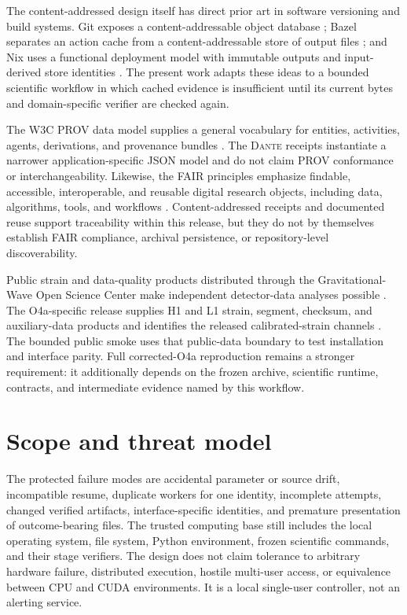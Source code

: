 \documentclass[aps,prd,twocolumn,superscriptaddress,nofootinbib,amsmath,amssymb,floatfix,10pt]{revtex4-2}
\newcommand{\dante}{\textsc{Dante}}
\begin{document}
The content-addressed design itself has direct prior art in software versioning
and build systems.  Git exposes a content-addressable object database
\cite{chacon2014progit}; Bazel separates an action cache from a
content-addressable store of output files \cite{bazel2026cache}; and Nix uses a
functional deployment model with immutable outputs and input-derived store
identities \cite{dolstra2006nix}.  The present work adapts these ideas to a
bounded scientific workflow in which cached evidence is insufficient until its
current bytes and domain-specific verifier are checked again.

The W3C PROV data model supplies a general vocabulary for entities, activities,
agents, derivations, and provenance bundles \cite{moreau2013provdm}.  The
\dante{} receipts instantiate a narrower application-specific JSON model and
do not claim PROV conformance or interchangeability.  Likewise, the FAIR
principles emphasize findable, accessible, interoperable, and reusable digital
research objects, including data, algorithms, tools, and workflows
\cite{wilkinson2016fair}.  Content-addressed receipts and documented reuse
support traceability within this release, but they do not by themselves
establish FAIR compliance, archival persistence, or repository-level
discoverability.

Public strain and data-quality products distributed through the
Gravitational-Wave Open Science Center make independent detector-data analyses
possible \cite{abbott2021gwosc}.  The O4a-specific release supplies H1 and L1
strain, segment, checksum, and auxiliary-data products and identifies the
released calibrated-strain channels \cite{gwosc2025o4a}.  The bounded public
smoke uses that public-data boundary to test installation and interface parity.
Full corrected-O4a reproduction remains a stronger requirement: it additionally
depends on the frozen archive, scientific runtime, contracts, and intermediate
evidence named by this workflow.

\section{Scope and threat model}
\label{sec:scope}

The protected failure modes are accidental parameter or source drift,
incompatible resume, duplicate workers for one identity, incomplete attempts,
changed verified artifacts, interface-specific identities, and premature
presentation of outcome-bearing files.  The trusted computing base still
includes the local operating system, file system, Python environment, frozen
scientific commands, and their stage verifiers.  The design does not claim
tolerance to arbitrary hardware failure, distributed execution, hostile
multi-user access, or equivalence between CPU and CUDA environments.  It is a
local single-user controller, not an alerting service.
\end{document}
